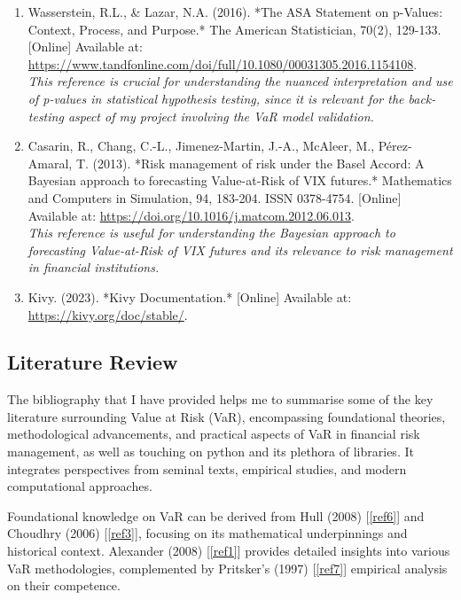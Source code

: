 \documentclass{article}
\begin{document}
\begin{small}
\begin{enumerate}
  \item\label{ref11} Wasserstein, R.L., \& Lazar, N.A. (2016). *The ASA Statement on p-Values: Context, Process, and Purpose.* The American Statistician, 70(2), 129-133. [Online] Available at: \url{https://www.tandfonline.com/doi/full/10.1080/00031305.2016.1154108}.
  \\\textit{This reference is crucial for understanding the nuanced interpretation and use of p-values in statistical hypothesis testing, since it is  relevant for the back-testing aspect of my project involving the VaR model validation.}

  \item\label{ref12} Casarin, R., Chang, C.-L., Jimenez-Martin, J.-A., McAleer, M., Pérez-Amaral, T. (2013). *Risk management of risk under the Basel Accord: A Bayesian approach to forecasting Value-at-Risk of VIX futures.* Mathematics and Computers in Simulation, 94, 183-204. ISSN 0378-4754. [Online] Available at: \url{https://doi.org/10.1016/j.matcom.2012.06.013}.
  \\\textit{This reference is useful for understanding the Bayesian approach to forecasting Value-at-Risk of VIX futures and its relevance to risk management in financial institutions.}

  \item\label{ref13} Kivy. (2023). *Kivy Documentation.* [Online] Available at: \url{https://kivy.org/doc/stable/}.

\end{enumerate}
\end{small}

\subsection{Literature Review}

The bibliography that I have provided helps me to summarise some of the key literature surrounding Value at Risk (VaR), encompassing foundational theories, methodological advancements, and practical aspects of VaR in financial risk management, as well as touching on python and its plethora of libraries. It integrates perspectives from seminal texts, empirical studies, and modern computational approaches.\\\vspace{0.3cm}

Foundational knowledge on VaR can be derived from Hull (2008) [\ref{ref6}] and Choudhry (2006) [\ref{ref3}], focusing on its mathematical underpinnings and historical context. Alexander (2008) [\ref{ref1}] provides detailed insights into various VaR methodologies, complemented by Pritsker's (1997) [\ref{ref7}] empirical analysis on their competence.\\\vspace{0.3cm}
\end{document}
